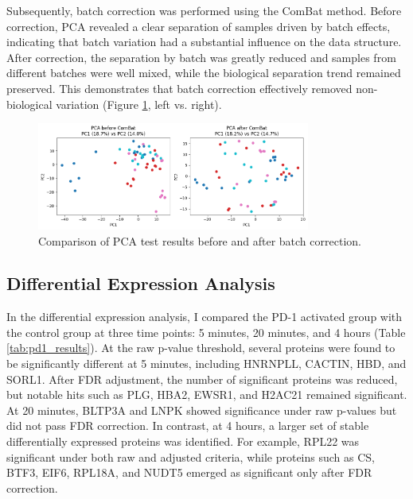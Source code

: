 \documentclass{article}
\begin{document}
      Subsequently, batch correction was performed using the ComBat method. Before correction, PCA revealed a clear separation of samples driven by batch effects, indicating that batch variation had a substantial influence on the data structure. After correction, the separation by batch was greatly reduced and samples from different batches were well mixed, while the biological separation trend remained preserved. This demonstrates that batch correction effectively removed non-biological variation (Figure \ref{fig:pca_combat}, left vs. right). 

      \begin{figure}[H]
        \centering
        \includegraphics[width=0.8\textwidth]{figures/pca_combat.png}
        \caption{Comparison of PCA test results before and after batch correction.}
        \label{fig:pca_combat}
      \end{figure}

    \subsection{Differential Expression Analysis}

      In the differential expression analysis, I compared the PD-1 activated group with the control group at three time points: 5 minutes, 20 minutes, and 4 hours (Table \ref{tab:pd1_results}). At the raw p-value threshold, several proteins were found to be significantly different at 5 minutes, including HNRNPLL, CACTIN, HBD, and SORL1. After FDR adjustment, the number of significant proteins was reduced, but notable hits such as PLG, HBA2, EWSR1, and H2AC21 remained significant. At 20 minutes, BLTP3A and LNPK showed significance under raw p-values but did not pass FDR correction. In contrast, at 4 hours, a larger set of stable differentially expressed proteins was identified. For example, RPL22 was significant under both raw and adjusted criteria, while proteins such as CS, BTF3, EIF6, RPL18A, and NUDT5 emerged as significant only after FDR correction.
\end{document}
